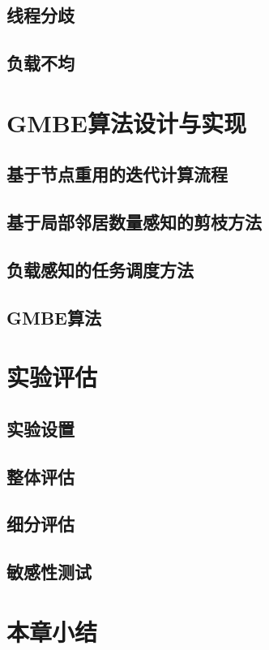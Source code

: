 \subsection{线程分歧}

\subsection{负载不均}


\section{GMBE算法设计与实现}

\subsection{基于节点重用的迭代计算流程}

\subsection{基于局部邻居数量感知的剪枝方法}

\subsection{负载感知的任务调度方法}

\subsection{GMBE算法}

\section{实验评估}

\subsection{实验设置}

\subsection{整体评估}

\subsection{细分评估}

\subsection{敏感性测试}

\section{本章小结}